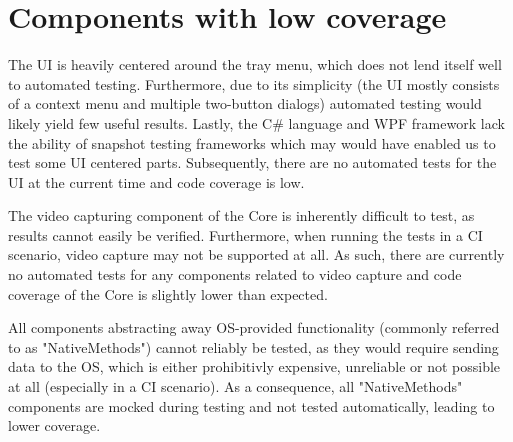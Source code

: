 \section{Components with low coverage}

The UI is heavily centered around the tray menu, which does not lend itself well to automated testing. Furthermore, due to its simplicity (the UI mostly consists of a context menu and multiple two-button dialogs) automated testing would likely yield few useful results. Lastly, the C\# language and WPF framework lack the ability of snapshot testing frameworks which may would have enabled us to test some UI centered parts.
Subsequently, there are no automated tests for the UI at the current time and code coverage is low.

The video capturing component of the Core is inherently difficult to test, as results cannot easily be verified. Furthermore, when running the tests in a CI scenario, video capture may not be supported at all. As such, there are currently no automated tests for any components related to video capture and code coverage of the Core is slightly lower than expected.

All components abstracting away OS-provided functionality (commonly referred to as "NativeMethods") cannot reliably be tested, as they would require sending data to the OS, which is either prohibitivly expensive, unreliable or not possible at all (especially in a CI scenario). As a consequence, all "NativeMethods" components are mocked during testing and not tested automatically, leading to lower coverage.